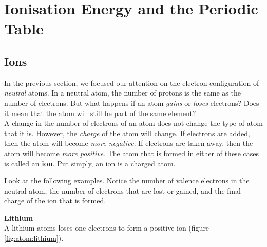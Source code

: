 



\section{Ionisation Energy and the Periodic Table}
\label{atom:ionisation}

\subsection{Ions}

In the previous section, we focused our attention on the electron configuration of \textit{neutral} atoms. In a neutral atom, the number of protons is the same as the number of electrons. But what happens if an atom \textit{gains} or \textit{loses} electrons? Does it mean that the atom will still be part of the same element? \\

A change in the number of electrons of an atom does not change the type of atom that it is. However, the \textit{charge} of the atom will change. If electrons are added, then the atom will become \textit{more negative}. If electrons are taken away, then the atom will become \textit{more positive}. The atom that is formed in either of these cases is called an \textbf{ion}. Put simply, an ion is a charged atom. 


Look at the following examples. Notice the number of valence electrons in the neutral atom, the number of electrons that are lost or gained, and the final charge of the ion that is formed.

\textbf{Lithium}\\

A lithium atoms loses one electrons to form a positive ion (figure \ref{fig:atom:lithium}).


